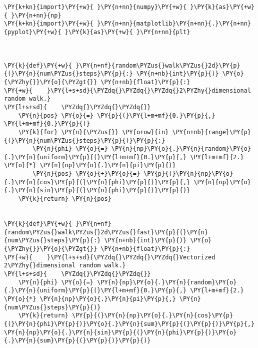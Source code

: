 \begin{Verbatim}[label=\makebox{\href{https://github.com/unipi-physics-labs/lab1-sheets/tree/main/snippy/random_walk.py}{https://github.com/.../random\_walk.py}},commandchars=\\\{\}]
\PY{k+kn}{import}\PY{+w}{ }\PY{n+nn}{numpy}\PY{+w}{ }\PY{k}{as}\PY{+w}{ }\PY{n+nn}{np}
\PY{k+kn}{import}\PY{+w}{ }\PY{n+nn}{matplotlib}\PY{n+nn}{.}\PY{n+nn}{pyplot}\PY{+w}{ }\PY{k}{as}\PY{+w}{ }\PY{n+nn}{plt}



\PY{k}{def}\PY{+w}{ }\PY{n+nf}{random\PYZus{}walk\PYZus{}2d}\PY{p}{(}\PY{n}{num\PYZus{}steps}\PY{p}{:} \PY{n+nb}{int}\PY{p}{)} \PY{o}{\PYZhy{}}\PY{o}{\PYZgt{}} \PY{n+nb}{float}\PY{p}{:}
\PY{+w}{    }\PY{l+s+sd}{\PYZdq{}\PYZdq{}\PYZdq{}2\PYZhy{}dimensional random walk.}
\PY{l+s+sd}{    \PYZdq{}\PYZdq{}\PYZdq{}}
    \PY{n}{pos} \PY{o}{=} \PY{p}{(}\PY{l+m+mf}{0.}\PY{p}{,} \PY{l+m+mf}{0.}\PY{p}{)}
    \PY{k}{for} \PY{n}{\PYZus{}} \PY{o+ow}{in} \PY{n+nb}{range}\PY{p}{(}\PY{n}{num\PYZus{}steps}\PY{p}{)}\PY{p}{:}
        \PY{n}{phi} \PY{o}{=} \PY{n}{np}\PY{o}{.}\PY{n}{random}\PY{o}{.}\PY{n}{uniform}\PY{p}{(}\PY{l+m+mf}{0.}\PY{p}{,} \PY{l+m+mf}{2.} \PY{o}{*} \PY{n}{np}\PY{o}{.}\PY{n}{pi}\PY{p}{)}
        \PY{n}{pos} \PY{o}{+}\PY{o}{=} \PY{p}{(}\PY{n}{np}\PY{o}{.}\PY{n}{cos}\PY{p}{(}\PY{n}{phi}\PY{p}{)}\PY{p}{,} \PY{n}{np}\PY{o}{.}\PY{n}{sin}\PY{p}{(}\PY{n}{phi}\PY{p}{)}\PY{p}{)}
    \PY{k}{return} \PY{n}{pos}


\PY{k}{def}\PY{+w}{ }\PY{n+nf}{random\PYZus{}walk\PYZus{}2d\PYZus{}fast}\PY{p}{(}\PY{n}{num\PYZus{}steps}\PY{p}{:} \PY{n+nb}{int}\PY{p}{)} \PY{o}{\PYZhy{}}\PY{o}{\PYZgt{}} \PY{n+nb}{float}\PY{p}{:}
\PY{+w}{    }\PY{l+s+sd}{\PYZdq{}\PYZdq{}\PYZdq{}Vectorized 2\PYZhy{}dimensional random walk.}
\PY{l+s+sd}{    \PYZdq{}\PYZdq{}\PYZdq{}}
    \PY{n}{phi} \PY{o}{=} \PY{n}{np}\PY{o}{.}\PY{n}{random}\PY{o}{.}\PY{n}{uniform}\PY{p}{(}\PY{l+m+mf}{0.}\PY{p}{,} \PY{l+m+mf}{2.} \PY{o}{*} \PY{n}{np}\PY{o}{.}\PY{n}{pi}\PY{p}{,} \PY{n}{num\PYZus{}steps}\PY{p}{)}
    \PY{k}{return} \PY{p}{(}\PY{n}{np}\PY{o}{.}\PY{n}{cos}\PY{p}{(}\PY{n}{phi}\PY{p}{)}\PY{o}{.}\PY{n}{sum}\PY{p}{(}\PY{p}{)}\PY{p}{,} \PY{n}{np}\PY{o}{.}\PY{n}{sin}\PY{p}{(}\PY{n}{phi}\PY{p}{)}\PY{o}{.}\PY{n}{sum}\PY{p}{(}\PY{p}{)}\PY{p}{)}



\end{Verbatim}
